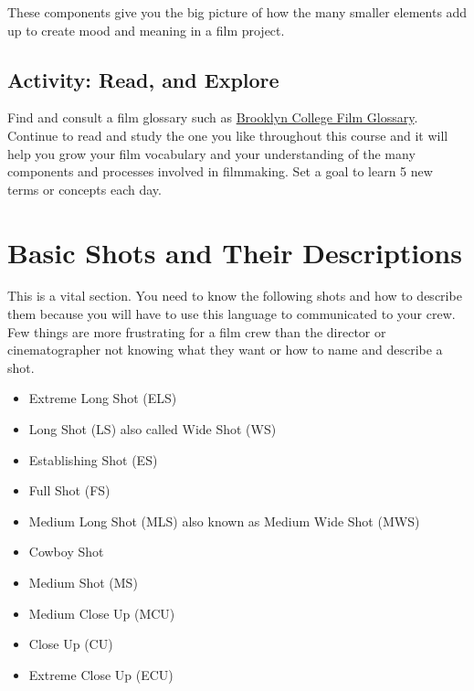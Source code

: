 \documentclass[
]{book}
\providecommand{\tightlist}{%
  \setlength{\itemsep}{0pt}\setlength{\parskip}{0pt}}
\begin{document}
These components give you the big picture of how the many smaller elements add up to create mood and meaning in a film project.

\hypertarget{activity-read-and-explore-1}{%
\subsection*{Activity: Read, and Explore}\label{activity-read-and-explore-1}}

\begin{reflect}
Find and consult a film glossary such as \href{http://userhome.brooklyn.cuny.edu/anthro/jbeatty/COURSES/glossary.htm}{Brooklyn College Film Glossary}. Continue to read and study the one you like throughout this course and it will help you grow your film vocabulary and your understanding of the many components and processes involved in filmmaking. Set a goal to learn 5 new terms or concepts each day.
\end{reflect}

\hypertarget{basic-shots-and-their-descriptions}{%
\section{Basic Shots and Their Descriptions}\label{basic-shots-and-their-descriptions}}

This is a vital section. You need to know the following shots and how to describe them because you will have to use this language to communicated to your crew. Few things are more frustrating for a film crew than the director or cinematographer not knowing what they want or how to name and describe a shot.

\begin{itemize}
\tightlist
\item
  Extreme Long Shot (ELS)\\
\item
  Long Shot (LS) also called Wide Shot (WS)\\
\item
  Establishing Shot (ES)\\
\item
  Full Shot (FS)\\
\item
  Medium Long Shot (MLS) also known as Medium Wide Shot (MWS)\\
\item
  Cowboy Shot\\
\item
  Medium Shot (MS)\\
\item
  Medium Close Up (MCU)\\
\item
  Close Up (CU)\\
\item
  Extreme Close Up (ECU)
\end{itemize}
\end{document}
